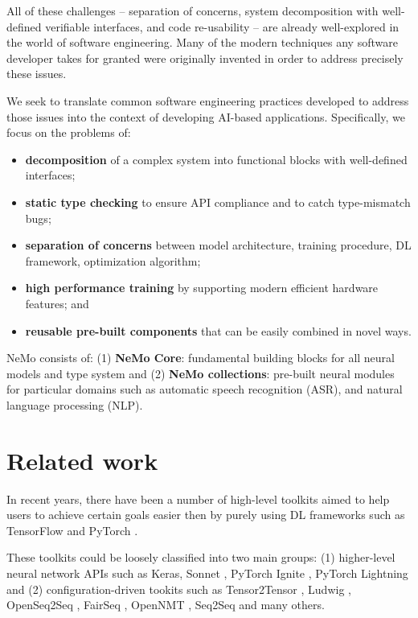 \documentclass{article}
\begin{document}
All of these challenges -- separation of concerns, system decomposition with well-defined verifiable interfaces, and code re-usability -- are already well-explored in the world of software engineering.  Many of the modern techniques any software developer takes for granted were originally invented in order to address precisely these issues.

We seek to translate common software engineering practices developed to address those issues into the context of developing AI-based applications. Specifically, we focus on the problems of:
\begin{itemize}
  \item \textbf{decomposition} of a complex system into functional blocks with well-defined interfaces;
  \item \textbf{static type checking} to ensure API compliance and to catch type-mismatch bugs;
  \item \textbf{separation of concerns} between model architecture, training procedure, DL framework, optimization algorithm;
  \item \textbf{high performance training} by supporting modern efficient hardware features; and
  \item \textbf{reusable pre-built components} that can be easily combined in novel ways.
\end{itemize}

NeMo consists of: (1) \textbf{NeMo Core}: fundamental building blocks for all neural models and type system and (2) \textbf{NeMo collections}: pre-built neural modules for particular domains such as automatic speech recognition (ASR), and natural language processing (NLP).

\section{Related work}\label{rel_work}
In recent years, there have been a number of high-level toolkits aimed to help users to achieve certain goals easier then by purely using DL frameworks such as TensorFlow \citep{tensorflow2015-whitepaper} and PyTorch \citep{paszke2017automatic}.

These toolkits could be loosely classified into two main groups: (1) higher-level neural network APIs such as Keras\citep{chollet2015keras}, Sonnet \citep{sonnetblog}, PyTorch Ignite \citep{ignite}, PyTorch Lightning \citep{lightning} and (2) configuration-driven tookits such as Tensor2Tensor \citep{tensor2tensor}, Ludwig \citep{ludwig}, OpenSeq2Seq \citep{kuchaiev2018}, FairSeq \citep{ott2019fairseq}, OpenNMT \citep{klein-etal-2017-opennmt}, Seq2Seq \citep{Britz:2017} and many others.
\end{document}

